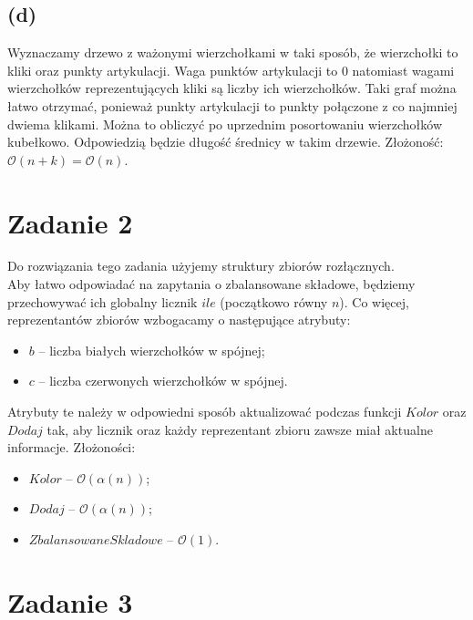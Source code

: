 \documentclass[12pt, a4paper]{article}
\newcommand{\MCALO}{\mathcal{O}}
\begin{document}
\subsection*{(d)}
Wyznaczamy drzewo z ważonymi wierzchołkami w taki sposób, że wierzchołki to
kliki oraz punkty artykulacji. Waga punktów artykulacji to $0$ natomiast wagami
wierzchołków reprezentujących kliki są liczby ich wierzchołków. Taki graf można
łatwo otrzymać, ponieważ punkty artykulacji to punkty połączone z co najmniej
dwiema klikami. Można to obliczyć po uprzednim posortowaniu wierzchołków
kubełkowo. Odpowiedzią będzie długość średnicy w takim drzewie. 
Złożoność: $\MCALO(n+k) = \MCALO(n)$.

\newpage
\section*{Zadanie 2}
Do rozwiązania tego zadania użyjemy struktury zbiorów rozłącznych.\\
Aby łatwo odpowiadać na zapytania o zbalansowane składowe, będziemy
przechowywać ich globalny licznik $ile$ (początkowo równy $n$). Co więcej,
reprezentantów zbiorów wzbogacamy o następujące atrybuty:
\begin{itemize}
  \item $\mathit{b}$ -- liczba białych wierzchołków w spójnej;
  \item $\mathit{c}$ -- liczba czerwonych wierzchołków w spójnej.
\end{itemize}
Atrybuty te należy w odpowiedni sposób aktualizować podczas funkcji
$\mathit{Kolor}$ oraz $\mathit{Dodaj}$ tak, aby licznik oraz każdy reprezentant
zbioru zawsze miał aktualne informacje. Złożoności: 
\begin{itemize}
  \item $\mathit{Kolor}$ -- $\MCALO(\alpha(n))$;
  \item $\mathit{Dodaj}$ -- $\MCALO(\alpha(n))$;
  \item $\mathit{ZbalansowaneSkladowe}$ -- $\MCALO(1)$.
\end{itemize}

\section*{Zadanie 3}
\end{document}

